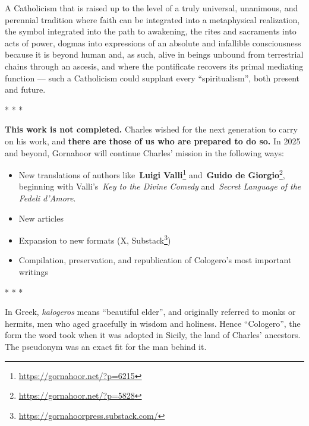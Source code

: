 \begin{quotex}
A Catholicism that is raised up to the level of a truly universal, unanimous, and perennial tradition where faith can be integrated into a metaphysical realization, the symbol integrated into the path to awakening, the rites and sacraments into acts of power, dogmas into expressions of an absolute and infallible consciousness because it is beyond human and, as such, alive in beings unbound from terrestrial chains through an ascesis, and where the pontificate recovers its primal mediating function --- such a Catholicism could supplant every ``spiritualism'', both present and future.

\end{quotex}


\begin{center}* * *\end{center}

\textbf{This work is not completed.} Charles wished for the next generation to carry on his work, and \textbf{there are those of us who are prepared to do so.} In 2025 and beyond, Gornahoor will continue Charles' mission in the following ways:

\begin{itemize}


\item New translations of authors like~\textbf{Luigi Valli}\footnote{\url{https://gornahoor.net/?p=6215}} and~\textbf{Guido de Giorgio}\footnote{\url{https://gornahoor.net/?p=5828}}, beginning with Valli's~\emph{Key to the Divine Comedy} and~\emph{Secret Language of the Fedeli d'Amore}.

\item New articles

\item Expansion to new formats (X, Substack\footnote{\url{https://gornahoorpress.substack.com/}})

\item Compilation, preservation, and republication of Cologero's most important writings
\end{itemize}


\begin{center}* * *\end{center}

In Greek, \emph{kalogeros} means ``beautiful elder'', and originally referred to monks or hermits, men who aged gracefully in wisdom and holiness. Hence ``Cologero'', the form the word took when it was adopted in Sicily, the land of Charles' ancestors. The pseudonym was an exact fit for the man behind it.

